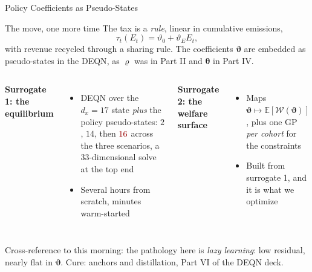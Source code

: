 \documentclass[aspectratio=169,11pt]{beamer}
\newcommand{\emphc}[1]{\textcolor{harvardcrimson}{#1}}
\newcommand{\E}[1]{\mathbb{E}\!\left[#1\right]}
\newcommand{\str}{\bm{\theta}}          %
\newcommand{\pol}{\bm{\vartheta}}       %
\begin{document}
\begin{frame}{Policy Coefficients as Pseudo-States}
\small
\begin{block}{The move, one more time}
The tax is a \emph{rule}, linear in cumulative emissions,
\[
\tau_t(E_t) = \vartheta_0 + \vartheta_E E_t ,
\]
with revenue recycled through a sharing rule. The coefficients $\pol$ are \emphc{embedded as pseudo-states in the DEQN}, as $\varrho$ was in Part II and $\str$ in Part IV.
\end{block}

\vspace{0.1cm}
\begin{columns}[T]
\textbf{Surrogate 1: the equilibrium}
\begin{itemize}\itemsep1pt
  \item DEQN over the $d_x = 17$ state \emph{plus} the policy pseudo-states: $2$, $14$, then $\emphc{16}$ across the three scenarios, a \emphc{33-dimensional} solve at the top end
  \item Several hours from scratch, minutes warm-started
\end{itemize}
\textbf{Surrogate 2: the welfare surface}
\begin{itemize}\itemsep1pt
  \item Maps $\pol \mapsto \E{\mathcal{W}(\pol)}$, plus one GP \emph{per cohort} for the constraints
  \item Built from surrogate 1, and it is what we optimize
\end{itemize}
\end{columns}

\vspace{0.04cm}
{\footnotesize \emphc{Cross-reference to this morning:} the pathology here is \emph{lazy learning}: low residual, nearly flat in $\pol$. Cure: anchors and distillation, Part VI of the DEQN deck.}
\end{frame}
\end{document}
